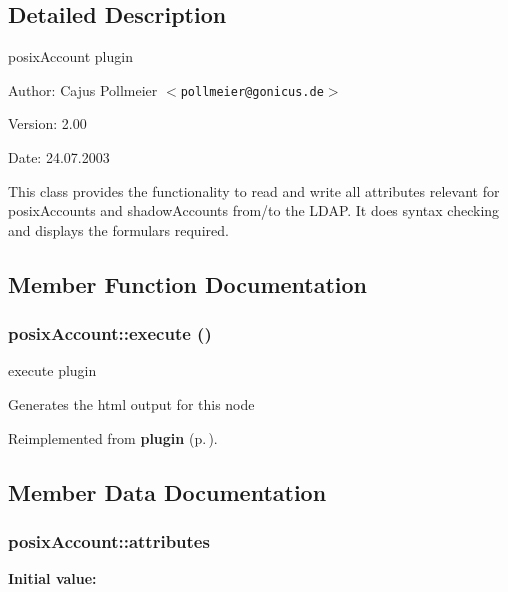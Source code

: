 \subsection{Detailed Description}
posix\-Account plugin 

\begin{Desc}
\item[Author:]Cajus Pollmeier $<${\tt pollmeier@gonicus.de}$>$ \end{Desc}
\begin{Desc}
\item[Version:]2.00 \end{Desc}
\begin{Desc}
\item[Date:]24.07.2003\end{Desc}
This class provides the functionality to read and write all attributes relevant for posix\-Accounts and shadow\-Accounts from/to the LDAP. It does syntax checking and displays the formulars required. 



\subsection{Member Function Documentation}
\subsubsection{\setlength{\rightskip}{0pt plus 5cm}posix\-Account::execute ()}\label{classposixAccount_a1}


execute plugin 

Generates the html output for this node 

Reimplemented from {\bf plugin} {\rm (p.\,\pageref{classplugin_a1})}.

\subsection{Member Data Documentation}
\subsubsection{\setlength{\rightskip}{0pt plus 5cm}posix\-Account::attributes}\label{classposixAccount_o30}


{\bf Initial value:}

